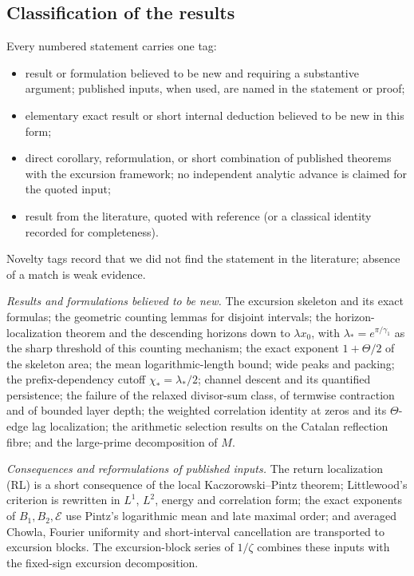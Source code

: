 \documentclass[11pt]{amsart}
\numberwithin{equation}{section}
\theoremstyle{plain}
\theoremstyle{definition}
\theoremstyle{remark}
\newcommand{\En}{\mathcal{E}}
\begin{document}
\subsection{Classification of the results}
\label{subsec:classification}
Every numbered statement carries one tag:
\begin{itemize}[leftmargin=2.5em]
\item[\textup{[N]}] result or formulation believed to be new and requiring a
substantive argument; published inputs, when used, are named in the statement
or proof;
\item[\textup{[N-el]}] elementary exact result or short internal deduction
believed to be new in this form;
\item[\textup{[C]}] direct corollary, reformulation, or short combination of
published theorems with the excursion framework; no independent analytic
advance is claimed for the quoted input;
\item[\textup{[L]}] result from the literature, quoted with reference (or a
classical identity recorded for completeness).
\end{itemize}
Novelty tags record that we did not find the statement in the literature;
absence of a match is weak evidence.

\smallskip\noindent\emph{Results and formulations believed to be new.}
The excursion skeleton and its exact formulas; the geometric counting lemmas
for disjoint intervals; the horizon-localization theorem and the descending
horizons down to $\lambda x_0$, with
$\lambda_*=e^{\pi/\gamma_1}$ as the sharp threshold of this counting
mechanism; the exact exponent $1+\Theta/2$ of the skeleton area; the mean
logarithmic-length bound; wide peaks and packing; the prefix-dependency cutoff
$\chi_*=\lambda_*/2$; channel descent and its quantified persistence; the
failure of the relaxed divisor-sum class, of termwise contraction and of
bounded layer depth; the weighted correlation identity at zeros and its
$\Theta$-edge lag localization; the arithmetic selection results on the
Catalan reflection fibre; and the large-prime decomposition of $M$.

\smallskip\noindent\emph{Consequences and reformulations of published inputs.}
The return localization (RL) is a short consequence of the local
Kaczorowski--Pintz theorem; Littlewood's criterion is rewritten in $L^1$,
$L^2$, energy and correlation form; the exact exponents of $B_1,B_2,\En$
use Pintz's logarithmic mean and late maximal order; and averaged Chowla,
Fourier uniformity and short-interval cancellation are transported to
excursion blocks.  The excursion-block series of $1/\zeta$ combines these
inputs with the fixed-sign excursion decomposition.
\end{document}
